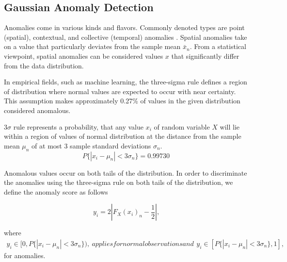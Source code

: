 \subsection{Gaussian Anomaly Detection}\label{AA:Anomaly}
Anomalies come in various kinds and flavors. Commonly denoted types are point (spatial), contextual, and collective (temporal) anomalies \cite{Chandola2009}.
Spatial anomalies take on a value that particularly deviates from the sample mean \(\bar x_n\). From a statistical viewpoint, spatial anomalies can be considered values \(x\) that significantly differ from the data distribution. 

In empirical fields, such as machine learning, the three-sigma rule defines a region of distribution where normal values are expected to occur with near certainty. This assumption makes approximately 0.27\% of values in the given distribution considered anomalous. 

\begin{definition}
3\(\sigma\) rule represents a probability, that any value \(x_i\) of random variable \(X\) will lie within a region of values of normal distribution at the distance from the sample mean \(\mu_n\) of at most 3 sample standard deviations \(\sigma_n\).
\begin{equation}
P\{|x_i-\mu_n|<3\sigma_n\}=0.99730
\end{equation}
\end{definition}

Anomalous values occur on both tails of the distribution. In order to discriminate the anomalies using the three-sigma rule on both tails of the distribution, we define the anomaly score as follows

\begin{equation}
y_i = 2 \left|{F_X(x_i)_n - \frac{1}{2}}\right|\text{,}\label{eq:score}
\end{equation}

where 
\begin{subequations}

\begin{align}
y_i \in [0,P\{|x_i-\mu_n|<3\sigma_n\})\text{,}\label{eq:score_norm}
\end{align}

applies for normal observations and 

\begin{align}
y_i \in [P\{|x_i-\mu_n|<3\sigma_n\},1]\text{,}\label{eq:score_anomaly}
\end{align}
\end{subequations}
 for anomalies.

